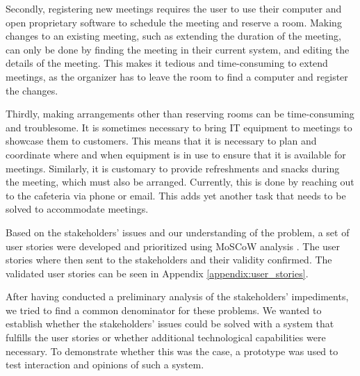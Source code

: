 Secondly, registering new meetings requires the user to use their computer and open proprietary software to schedule the meeting and reserve a room.
Making changes to an existing meeting, such as extending the duration of the meeting, can only be done by finding the meeting in their current system, and editing the details of the meeting.
This makes it tedious and time-consuming to extend meetings, as the organizer has to leave the room to find a computer and register the changes.

Thirdly, making arrangements other than reserving rooms can be time-consuming and troublesome. 
It is sometimes necessary to bring IT equipment to meetings to showcase them to customers.
This means that it is necessary to plan and coordinate where and when equipment is in use to ensure that it is available for meetings. 
Similarly, it is customary to provide refreshments and snacks during the meeting, which must also be arranged. 
Currently, this is done by reaching out to the cafeteria via phone or email.
This adds yet another task that needs to be solved to accommodate meetings.

Based on the stakeholders' issues and our understanding of the problem, a set of user stories were developed and prioritized using MoSCoW analysis \cite{benyon2013designing}.
The user stories where then sent to the stakeholders and their validity confirmed.  
The validated user stories can be seen in Appendix \ref{appendix:user_stories}.

After having conducted a preliminary analysis of the stakeholders' impediments, we tried to find a common denominator for these problems.
We wanted to establish whether the stakeholders' issues could be solved with a system that fulfills the user stories or whether additional technological capabilities were necessary. 
To demonstrate whether this was the case, a prototype was used to test interaction and opinions of such a system.
